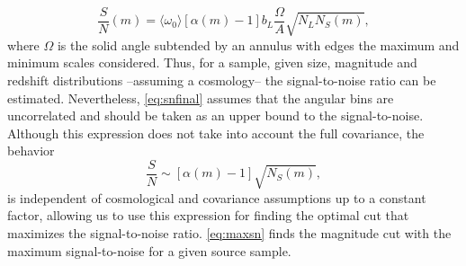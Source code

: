 \begin{equation}
\frac{S}{N}(m) = \langle\omega_0\rangle[\alpha(m)-1]b_L\frac{\Omega}{A}\sqrt{N_LN_S(m)},
\label{eq:snfinal}
\end{equation}
where $\Omega$ is the solid angle subtended by an annulus with edges the maximum and minimum scales considered. Thus, for a sample, given size, magnitude and redshift distributions --assuming a cosmology-- the signal-to-noise ratio can be estimated. Nevertheless, \autoref{eq:snfinal} assumes that the angular bins are uncorrelated and should be taken as an upper bound to the signal-to-noise. Although this expression does not take into account the full covariance, the behavior
\begin{equation}
\frac{S}{N} \sim [\alpha(m)-1]\sqrt{N_S(m)},
\label{eq:maxsn}
\end{equation}
is independent of cosmological and covariance assumptions up to a constant factor, allowing us to use this expression for finding the optimal cut that maximizes the signal-to-noise ratio. \autoref{eq:maxsn} finds the magnitude cut with the maximum signal-to-noise for a given source sample.


